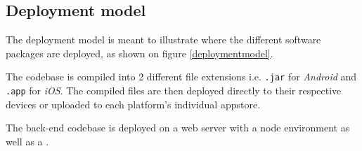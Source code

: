 \subsection{Deployment model}
The deployment model is meant to illustrate where the different software packages are deployed, as shown on figure \ref{deploymentmodel}.

The  codebase is compiled into 2 different file extensions i.e. \verb+.jar+ for \textit{Android} and \verb+.app+ for \textit{iOS}. The compiled files are then deployed directly to their respective devices or uploaded to each platform's individual \gls{appstore}.

The back-end codebase is deployed on a web server with a \gls{node} environment as well as a .

